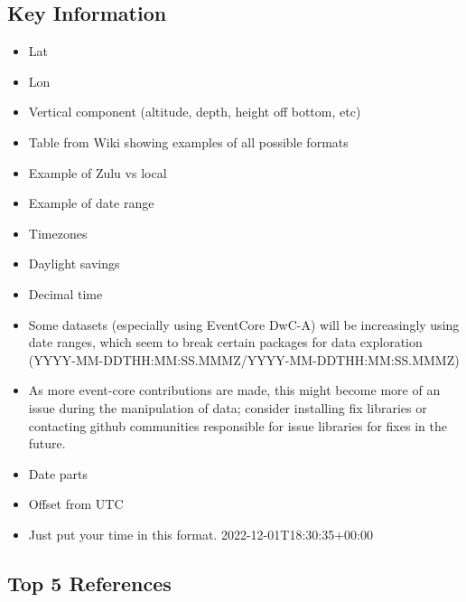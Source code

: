 \documentclass[
  oneside]{book}
\providecommand{\tightlist}{%
  \setlength{\itemsep}{0pt}\setlength{\parskip}{0pt}}
\begin{document}
\hypertarget{key-information-2}{%
\subsection{Key Information}\label{key-information-2}}

\begin{itemize}
\tightlist
\item
  Lat
\item
  Lon
\item
  Vertical component (altitude, depth, height off bottom, etc)
\item
  Table from Wiki showing examples of all possible formats
\item
  Example of Zulu vs local
\item
  Example of date range
\item
  Timezones
\item
  Daylight savings
\item
  Decimal time
\item
  Some datasets (especially using EventCore DwC-A) will be increasingly using date ranges, which seem to break certain packages for data exploration (YYYY-MM-DDTHH:MM:SS.MMMZ/YYYY-MM-DDTHH:MM:SS.MMMZ)
\item
  As more event-core contributions are made, this might become more of an issue during the manipulation of data; consider installing fix libraries or contacting github communities responsible for issue libraries for fixes in the future.
\item
  Date parts
\item
  Offset from UTC
\item
  Just put your time in this format. 2022-12-01T18:30:35+00:00
\end{itemize}

\hypertarget{top-5-references-2}{%
\subsection{Top 5 References}\label{top-5-references-2}}
\end{document}
